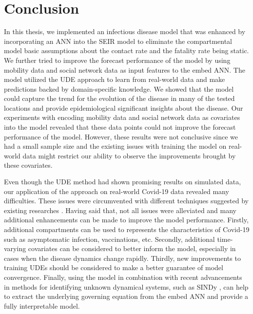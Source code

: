 \chapter{Conclusion}
\label{chap:conclusion}

In this thesis, we implemented an infectious disease model that was enhanced by incorporating an \gls{ANN} into the \gls{SEIR} model to eliminate the compartmental model basic assumptions about the contact rate and the fatality rate being static.
We further tried to improve the forecast performance of the model by using mobility data and social network data as input features to the embed \gls{ANN}.
The model utilized the \gls{UDE} approach \cite{rackauckasUniversalDifferentialEquations2020} to learn from real-world data and make predictions backed by domain-specific knowledge.
We showed that the model could capture the trend for the evolution of the disease in many of the tested locations and provide epidemiological significant insights about the disease.
Our experiments with encoding mobility data and social network data as covariates into the model revealed that these data points could not improve the forecast performance of the model.
However, these results were not conclusive since we had a small sample size and the existing issues with training the model on real-world data might restrict our ability to observe the improvements brought by these covariates.

Even though the \gls{UDE} method had shown promising results on simulated data, our application of the approach on real-world Covid-19 data revealed many difficulties.
These issues were circumvented with different techniques suggested by existing researches \cite{kimStiffNeuralOrdinary2021,rackauckasUniversalDifferentialEquations2020}.
Having said that, not all issues were alleviated and many additional enhancements can be made to improve the model performance.
Firstly, additional compartments can be used to represents the characteristics of Covid-19 such as asymptomatic infection, vaccinations, etc.
Secondly, additional time-varying covariates can be considered to better inform the model, especially in cases when the disease dynamics change rapidly.
Thirdly, new improvements to training \glspl{UDE} should be considered to make a better guarantee of model convergence.
Finally, using the model in combination with recent advancements in methods for identifying unknown dynamical systems, such as \gls{SINDy} \cite{bruntonDiscoveringGoverningEquations2016}, can help to extract the underlying governing equation from the embed \gls{ANN} and provide a fully interpretable model.